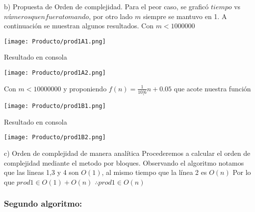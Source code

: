 \documentclass[12pt,twoside]{article}
\begin{document}
\begin{enumerate} b) Propuesta de Orden de complejidad. \newline\newline
Para el peor caso, se graficó $tiempo$ vs $números que n fuera tomando$, por otro lado $m$ siempre se mantuvo en 1. A continuación se muestran algunos resultados.\newline\newline
Con $m < 1000000$\newline
\begin{center}
    \texttt{[image: Producto/prod1A1.png]}
\end{center}
Resultado en consola
\begin{center}
    \texttt{[image: Producto/prod1A2.png]}
\end{center}
Con $m < 10000000$ y proponiendo $f(n) = \frac{1}{10[6}n + 0.05$ que acote nuestra función\newline
\begin{center}
    \texttt{[image: Producto/prod1B1.png]}
\end{center}
Resultado en consola
\begin{center}
    \texttt{[image: Producto/prod1B2.png]}
\end{center}
\end{enumerate}
\begin{enumerate} c) Orden de complejidad de manera analítica
\newline\newline
Procederemos a calcular el orden de complejidad mediante el m\´etodo por bloques.
Observando el algoritmo notamos que las lineas 1,3 y 4 son $O(1)$, al mismo tiempo que la línea 2 es $O(n)$\newline
Por lo que \newline
$prod1 \in O(1) + O(n)$\newline
$\therefore prod1 \in O(n)$

\end{enumerate}

\subsubsection{Segundo algoritmo:}
\end{document}
